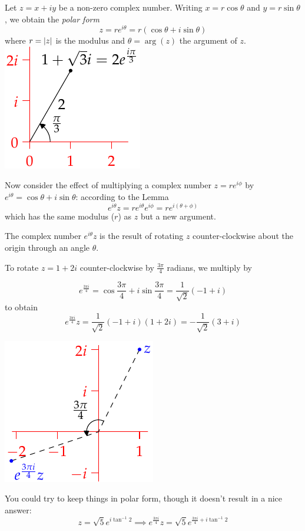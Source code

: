 \begin{defn}[lower separated=false, sidebyside, sidebyside align=top seam, sidebyside gap=0pt, righthand width=0.34\linewidth]{}{}
Let $z=x+iy$ be a non-zero complex number.\smallbreak
Writing $x=r\cos\theta$ and $y=r\sin\theta$, we obtain the \emph{polar form}
\[z=re^{i\theta}=r(\cos\theta+i\sin\theta)\]
where $r=\left| z\right|$ is the modulus and $\theta=\arg(z)$ the argument of $z$.
\tcblower
\flushright\includegraphics{complex-polar}
\end{defn}

Now consider the effect of multiplying a complex number $z=re^{i\phi}$ by $e^{i\theta}=\cos\theta+i\sin\theta$: according to the Lemma
\[e^{i\theta}z=re^{i\theta}e^{i\phi}=re^{i(\theta+\phi)}\]
which has the same modulus ($r$) as $z$ but a new argument.

\begin{thm}{}{}
The complex number $e^{i\theta}z$ is the result of rotating $z$ counter-clockwise about the origin through an angle $\theta$.
\end{thm}

\begin{example}{}{}
To rotate $z=1+2i$ counter-clockwise by $\frac{3\pi}4$ radians, we multiply by\par
\begin{minipage}[t]{0.69\linewidth}\vspace{-5pt}
\[e^{\frac{3\pi i}4}=\cos\frac{3\pi}4+i\sin\frac{3\pi}4=\frac 1{\sqrt 2}(-1+i)\]
to obtain
\[
e^{\frac{3\pi i}4}z =\frac 1{\sqrt 2}(-1+i)(1+2i)=-\frac 1{\sqrt 2}(3+i)
\]
\end{minipage}\hfill\begin{minipage}[t]{0.3\linewidth}\vspace{-15pt}
\flushright\includegraphics{complex-rotate}
\end{minipage}\medbreak
You could try to keep things in polar form, though it doesn't result in a nice answer:
\[z=\sqrt 5e^{i\tan^{-1}2}\implies e^{\frac{3\pi i}4}z=\sqrt 5e^{\frac{3\pi i}4+i\tan^{-1}2}\]
\end{example}




